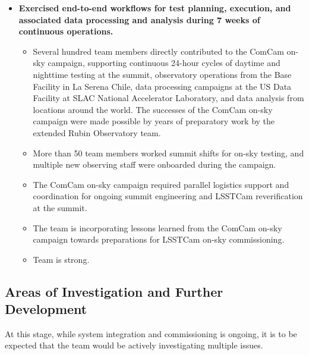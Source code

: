\begin{itemize}
    \item \textbf{Exercised end-to-end workflows for test planning, execution, and associated data processing and analysis during 7 weeks of continuous operations.}
    \begin{itemize}
        \item Several hundred team members directly contributed to the ComCam on-sky campaign, supporting continuous 24-hour cycles of daytime and nighttime testing at the summit, observatory operations from the Base Facility in La Serena Chile, data processing campaigns at the US Data Facility at SLAC National Accelerator Laboratory, and data analysis from locations around the world.
        The successes of the ComCam on-sky campaign were made possible by years of preparatory work by the extended Rubin Observatory team.
        \item More than 50 team members worked summit shifts for on-sky testing, and multiple new observing staff were onboarded during the campaign.
        \item The ComCam on-sky campaign required parallel logistics support and coordination for ongoing summit engineering and LSSTCam reverification at the summit.
        \item The team is incorporating lessons learned from the ComCam on-sky campaign towards preparations for LSSTCam on-sky commissioning.
        \item Team is strong.
    \end{itemize}
\end{itemize}

\subsection{Areas of Investigation and Further Development}

At this stage, while system integration and commissioning is ongoing, it is to be expected that the team
would be actively investigating multiple issues.

